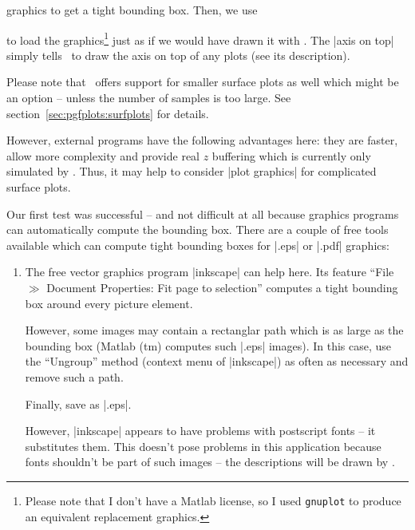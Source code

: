 \begin{addplotoperation}[]{graphics}{}
	to get a tight bounding box. Then, we use

\begin{codeexample}[]
\end{codeexample}
\noindent to load the graphics\footnote{Please note that I don't have a Matlab license, so I used \texttt{gnuplot} to produce an equivalent replacement graphics.} just as if we would have drawn it with \PGFPlots. The |axis on top| simply tells \PGFPlots\ to draw the axis on top of any plots (see its description).

Please note that \PGFPlots\ offers support for smaller surface plots as well which might be an option -- unless the number of samples is too large. See section~\ref{sec:pgfplots:surfplots} for details.

\noindent However, external programs have the following advantages here: they are faster, allow more complexity and provide real $z$ buffering which is currently only simulated by \PGFPlots. Thus, it may help to consider |plot graphics| for complicated surface plots.

Our first test was successful -- and not difficult at all because graphics programs can automatically compute the bounding box. There are a couple of free tools available which can compute tight bounding boxes for |.eps| or |.pdf| graphics:
\begin{enumerate}
	\item The free vector graphics program |inkscape| can help here. Its feature ``File $\gg$ Document Properties: Fit page to selection'' computes a tight bounding box around every picture element. 

	However, some images may contain a rectanglar path which is as large as the bounding box (Matlab (tm) computes such |.eps| images). In this case, use the ``Ungroup'' method (context menu of |inkscape|) as often as necessary and remove such a path.

	Finally, save as |.eps|.

	However, |inkscape| appears to have problems with postscript fonts -- it substitutes them. This doesn't pose problems in this application because fonts shouldn't be part of such images -- the descriptions will be drawn by \PGFPlots.


\end{enumerate}
\end{addplotoperation}
